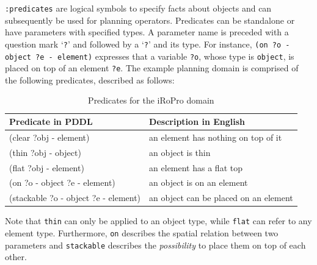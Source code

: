 \texttt{:predicates} are logical symbols to specify facts about objects and can subsequently be used for planning operators.
Predicates can be standalone or have parameters with specified types. 
A parameter name is preceded with a question mark `\texttt{?}' and followed by a `\texttt{?}' and its type. 
For instance, \texttt{(on ?o - object ?e - element)} expresses that a variable \texttt{?o}, whose type is \texttt{object}, is placed on top of an element \texttt{?e}.
The example planning domain is comprised of the following predicates, described as follows:

\begin{table}[h]
\begin{center}
	\label{tab:predicates}
	\caption{Predicates for the {iRoPro} domain}
\begin{tabular}{l|l}
Predicate in PDDL & Description in English\\ \hline
(clear ?obj - element) & an element has nothing on top of it \\
(thin ?obj - object) & an object is thin\\
(flat ?obj - element) & an element has a flat top \\
(on ?o - object ?e - element)& an object is on an element\\
(stackable ?o - object ?e - element) & an object can be placed on an element\\
\end{tabular}
\end{center}
\end{table}%

Note that \texttt{thin} can only be applied to an object type, while \texttt{flat} can refer to any element type.
Furthermore, \texttt{on} describes the spatial relation between two parameters and \texttt{stackable} describes the \textit{possibility} to place them on top of each other.

